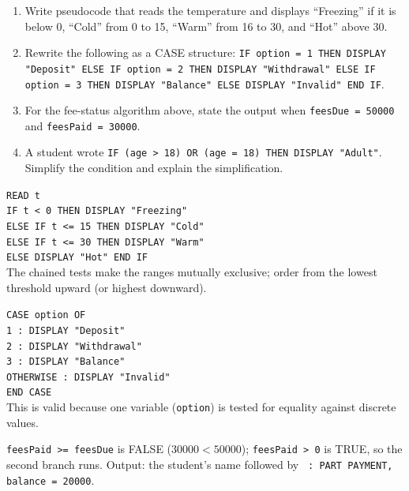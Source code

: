 \documentclass[11pt]{article}
\begin{document}
\begin{exercice}[Practice]
\begin{enumerate}
\item Write pseudocode that reads the temperature and displays ``Freezing'' if it is below 0, ``Cold'' from 0 to 15, ``Warm'' from 16 to 30, and ``Hot'' above 30.
\item Rewrite the following as a CASE structure: \texttt{IF option = 1 THEN DISPLAY "Deposit" ELSE IF option = 2 THEN DISPLAY "Withdrawal" ELSE IF option = 3 THEN DISPLAY "Balance" ELSE DISPLAY "Invalid" END IF}.
\item For the fee-status algorithm above, state the output when \texttt{feesDue = 50000} and \texttt{feesPaid = 30000}.
\item A student wrote \texttt{IF (age > 18) OR (age = 18) THEN DISPLAY "Adult"}. Simplify the condition and explain the simplification.
\end{enumerate}
\end{exercice}

\begin{corrige}[Exercise 1]
\texttt{READ t}\\
\texttt{IF t < 0 THEN DISPLAY "Freezing"}\\
\texttt{ELSE IF t <= 15 THEN DISPLAY "Cold"}\\
\texttt{ELSE IF t <= 30 THEN DISPLAY "Warm"}\\
\texttt{ELSE DISPLAY "Hot" END IF}\\
The chained tests make the ranges mutually exclusive; order from the lowest threshold upward (or highest downward).
\end{corrige}

\begin{corrige}[Exercise 2]
\texttt{CASE option OF}\\
\qquad \texttt{1 : DISPLAY "Deposit"}\\
\qquad \texttt{2 : DISPLAY "Withdrawal"}\\
\qquad \texttt{3 : DISPLAY "Balance"}\\
\qquad \texttt{OTHERWISE : DISPLAY "Invalid"}\\
\texttt{END CASE}\\
This is valid because one variable (\texttt{option}) is tested for equality against discrete values.
\end{corrige}

\begin{corrige}[Exercise 3]
\texttt{feesPaid >= feesDue} is FALSE ($30000 < 50000$); \texttt{feesPaid > 0} is TRUE, so the second branch runs. Output: the student's name followed by \texttt{ : PART PAYMENT, balance = 20000}.
\end{corrige}
\end{document}

